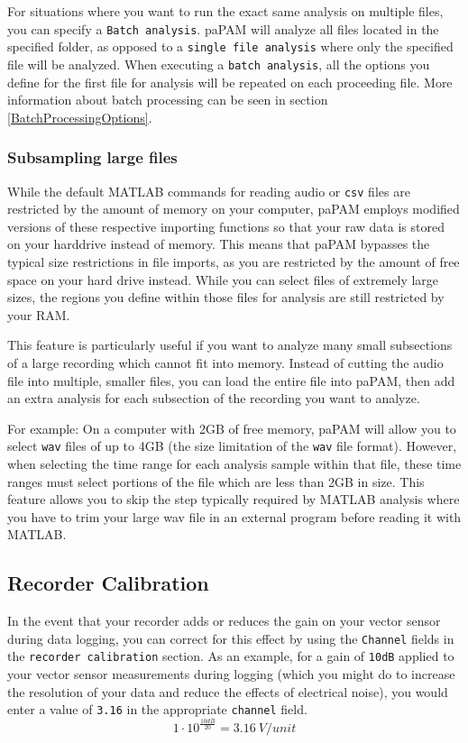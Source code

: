 \documentclass[11pt]{report}
\begin{document}
For situations where you want to run the exact same analysis on multiple
files, you can specify a \texttt{Batch analysis}. paPAM will analyze all files located
in the specified folder, as opposed to a \texttt{single file analysis} where only
the specified file will be analyzed. When executing a \texttt{batch analysis}, all the
options you define for the first file for analysis will be repeated
on each proceeding file. More information about batch processing can be
seen in section \ref{BatchProcessingOptions}.

\subsubsection{Subsampling large files}
While the default MATLAB commands for reading audio or \texttt{csv} files are restricted by the amount of memory on your computer, paPAM employs modified versions of these respective importing functions so that your raw data is stored on your harddrive instead of memory.  This means that paPAM bypasses the typical size restrictions in file imports, as you are restricted by the amount of free space on your hard drive instead.  While you can select files of extremely large sizes, the regions you define within those files for analysis are still restricted by your RAM.

This feature is particularly useful if you want to analyze many small subsections of a large recording which cannot fit into memory.  Instead of cutting the audio file into multiple, smaller files, you can load the entire file into paPAM, then add an extra analysis for each subsection of the recording you want to analyze.

For example:  On a computer with 2GB of free memory, paPAM will allow you to select \texttt{wav} files of up to 4GB (the size limitation of the \texttt{wav} file format).  However, when selecting the time range for each analysis sample  within that file, these time ranges must select portions of the file which are less than 2GB in size.  This feature allows you to skip the step typically required by MATLAB analysis where you have to trim your large wav file in an external program before reading it with MATLAB.

\subsection{Recorder Calibration}

In the event that your recorder adds or reduces the gain on your vector sensor during data logging, you can correct for this effect by using the \texttt{Channel} fields in the \texttt{recorder calibration} section.  As an example, for a gain of \texttt{10dB} applied to your vector sensor measurements during logging (which you might do to increase the resolution of your data and reduce the effects of electrical noise), you would enter a value of \texttt{3.16} in the appropriate \texttt{channel} field. $$1\cdot10^\frac{10dB}{20} = 3.16\  \mathit{V/unit}$$
\end{document}
